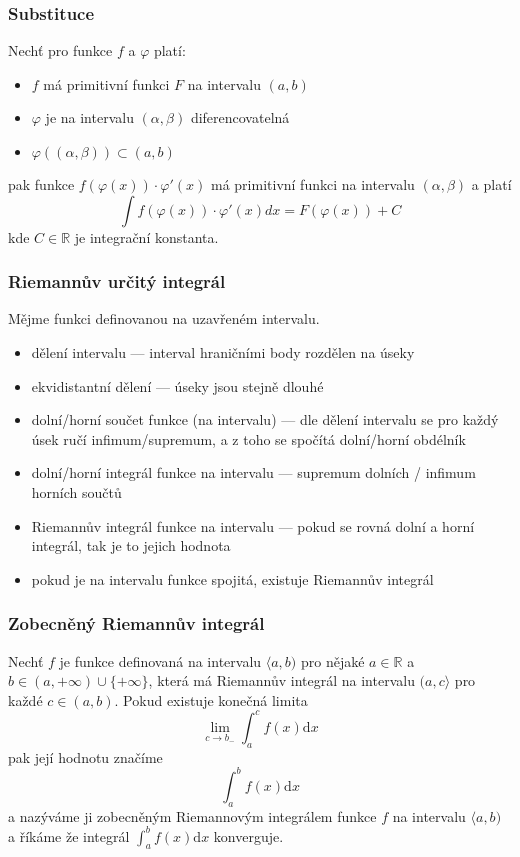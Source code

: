 \subsubsection*{Substituce}
Nechť pro funkce $f$ a $\varphi$ platí:
\begin{itemize}
    \item $f$ má primitivní funkci $F$ na intervalu $(a,b)$
    \item $\varphi$ je na intervalu $(\alpha, \beta)$ diferencovatelná
    \item $\varphi((\alpha, \beta)) \subset (a,b)$
\end{itemize}
pak funkce $f(\varphi(x)) \cdot \varphi'(x)$ má primitivní funkci na intervalu $(\alpha, \beta)$ a platí $$\int f(\varphi(x)) \cdot \varphi'(x)dx = F(\varphi(x)) + C$$
kde $C \in \mathbb{R}$ je  integrační konstanta.

\subsubsection*{Riemannův určitý integrál}
Mějme funkci definovanou na uzavřeném intervalu.
\begin{itemize}
    \item dělení intervalu --- interval hraničními body rozdělen na úseky
    \item ekvidistantní dělení --- úseky jsou stejně dlouhé
    \item dolní/horní součet funkce (na intervalu) --- dle dělení intervalu se pro každý úsek ručí infimum/supremum, a z toho se spočítá dolní/horní obdélník
    \item dolní/horní integrál funkce na intervalu --- supremum dolních / infimum horních součtů
    \item Riemannův integrál funkce na intervalu --- pokud se rovná dolní a horní integrál, tak je to jejich hodnota
    \item pokud je na intervalu funkce spojitá, existuje Riemannův integrál
\end{itemize}

\subsubsection*{Zobecněný Riemannův integrál}
Nechť $f$ je funkce definovaná na intervalu $\langle a,b)$ pro nějaké $a \in \mathbb{R}$ a $b \in (a, +\infty) \cup \{+\infty\}$, která má Riemannův integrál na intervalu $(a,c \rangle$ pro každé $c\in (a, b)$. Pokud existuje konečná limita $$\lim_{c\to b_{-}} \int_a^c f(x)\text{d}x$$
pak její hodnotu značíme $$\int_a^b f(x)\text{d}x$$
a nazýváme ji zobecněným Riemannovým integrálem funkce $f$ na intervalu $\langle a,b)$ a říkáme že integrál $\int_a^b f(x)\text{d}x$ konverguje.

